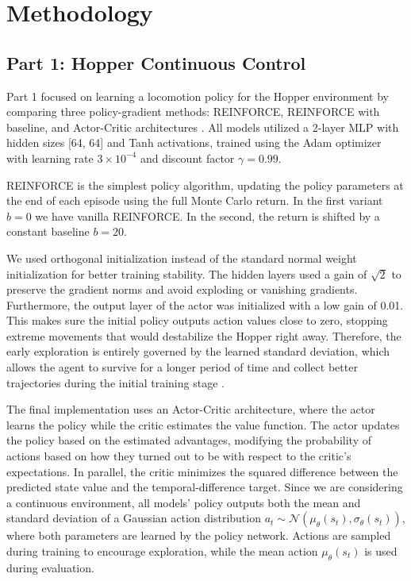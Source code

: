 \section{Methodology}
\subsection{Part 1: Hopper Continuous Control}

Part 1 focused on learning a locomotion policy for the Hopper environment by comparing three policy-gradient methods: REINFORCE, REINFORCE with baseline, and Actor-Critic architectures \cite{SuttonBarto2018}.
All models utilized a 2-layer MLP with hidden sizes [64, 64] and Tanh activations, trained using the Adam optimizer with learning rate $3 \times 10^{-4}$ and discount factor $\gamma = 0.99$.

REINFORCE \cite{Williams1992} is the simplest policy algorithm, updating the policy parameters at the end of each episode using the full Monte Carlo return.
In the first variant $b=0$ we have vanilla REINFORCE. In the second, the return is shifted by a constant baseline $b = 20$.

We used orthogonal initialization \cite{saxe2013exact} instead of the standard normal weight initialization for better training stability.
The hidden layers used a gain of $\sqrt{2}$ to preserve the gradient norms and avoid exploding or vanishing gradients.
Furthermore, the output layer of the actor was initialized with a low gain of 0.01.
This makes sure the initial policy outputs action values close to zero, stopping extreme movements that would destabilize the Hopper right away.
Therefore, the early exploration is entirely governed by the learned standard deviation, which allows the agent to survive for a longer period of time and collect better trajectories during the initial training stage \cite{andrychowicz2020matters}.

The final implementation uses an Actor-Critic architecture, where the actor learns the policy while the critic estimates
the value function. The actor updates the policy based on the estimated advantages, modifying the probability of actions
based on how they turned out to be with respect to the critic’s expectations.
In parallel, the critic minimizes the squared difference between the predicted state value and the temporal-difference target.
Since we are considering a continuous environment, all models' policy outputs both the mean and standard
deviation of a Gaussian action distribution $a_t \sim \mathcal N(\mu_\theta(s_t), \sigma_\theta(s_t))$, where both parameters are learned by the policy network.
Actions are sampled during training to encourage exploration, while the mean action $\mu_\theta(s_t)$ is used during evaluation.

